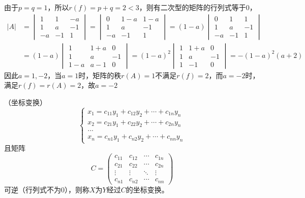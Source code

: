 \begin{solution}
    由于$p=q=1$，所以$r(f) = p+q = 2 < 3$，则有二次型的矩阵的行列式等于$0$，
    \begin{align*}
        |A| & =
        \begin{vmatrix}
            1  & 1  & -a \\
            1  & a  & -1 \\
            -a & -1 & 1
        \end{vmatrix}
        =
        \begin{vmatrix}
            0  & 1-a & 1-a \\
            1  & a   & -1  \\
            -a & -1  & 1
        \end{vmatrix}
        =(1-a)
        \begin{vmatrix}
            0  & 1  & 1  \\
            1  & a  & -1 \\
            -a & -1 & 1
        \end{vmatrix}
        \\
            & =(1-a)
        \begin{vmatrix}
            1   & 1+a & 0  \\
            1   & a   & -1 \\
            1-a & a-1 & 0
        \end{vmatrix}
        =(1-a)^2
        \begin{vmatrix}
            1 & 1+a & 0  \\
            1 & a   & -1 \\
            1 & -1  & 0
        \end{vmatrix}
        =-(1-a)^2(a+2)
    \end{align*}
    因此$a=1,-2$，当$a=1$时，矩阵的秩$r(A)=1$不满足$r(f)=2$，而$a=-2$时，满足$r(f)=r(A)=2$，故$a=-2$

\end{solution}

\begin{definition}
    （坐标变换）
    \[
        \begin{cases}
            x_1 = c_{11}y_1 + c_{12}y_2 + \cdots + c_{1n}y_n \\
            x_2 = c_{21}y_1 + c_{22}y_2 + \cdots + c_{2n}y_n \\
            ...                                              \\
            x_n = c_{n1}y_1 + c_{n2}y_2 + \cdots + c_{nn}y_n
        \end{cases}
    \]
    且矩阵
    \[
        C =
        \begin{pmatrix}
            c_{11} & c_{12} & \cdots & c_{1n} \\
            c_{21} & c_{22} & \cdots & c_{2n} \\
            \vdots & \vdots & \ddots & \vdots \\
            c_{n1} & c_{n2} & \cdots & c_{nn}
        \end{pmatrix}
    \]
    可逆（行列式不为$0$），则称$X$为$Y$经过$C$的坐标变换。
\end{definition}

